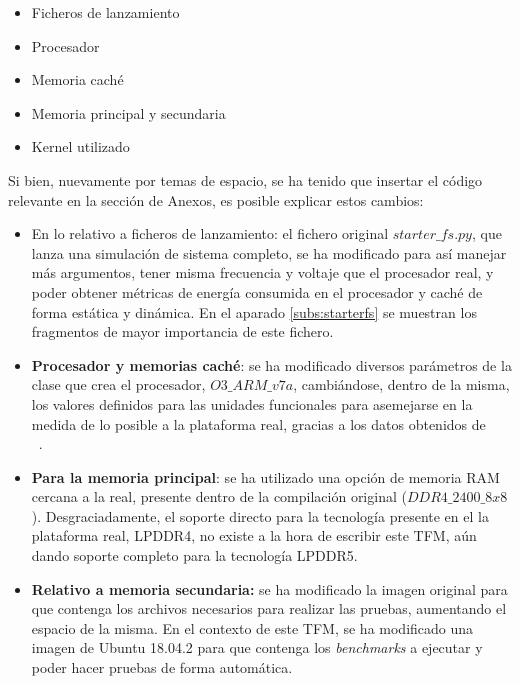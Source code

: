 \begin{itemize}[noitemsep]
\item Ficheros de lanzamiento
\item Procesador
\item Memoria caché
\item Memoria principal y secundaria
\item Kernel utilizado
\end{itemize}

Si bien, nuevamente por temas de espacio, se ha tenido que insertar el código relevante en la sección de Anexos, es posible explicar estos cambios:

\begin{itemize}
    \item En lo relativo a ficheros de lanzamiento: el fichero original $starter\_fs.py$, que lanza una simulación de sistema completo, se ha modificado para así manejar más argumentos, tener misma frecuencia y voltaje que el procesador real, y poder obtener métricas de energía consumida en el procesador y caché de forma estática y dinámica. En el aparado \ref{subs:starterfs} se muestran los fragmentos de mayor importancia de este fichero.
    
    \item \textbf{Procesador y memorias caché}: se ha modificado diversos parámetros de la clase que crea el procesador, $O3\_ARM\_v7a$, cambiándose, dentro de la misma, los valores definidos para las unidades funcionales para asemejarse en la medida de lo posible a la plataforma real, gracias a los datos obtenidos de ~\cite{A72-Gem5-pierre} ~\cite{datasheetA72}.
    
    \item \textbf{Para la memoria principal}: se ha utilizado una opción de memoria RAM cercana a la real, presente dentro de la compilación original ($DDR4\_2400\_8x8$). Desgraciadamente, el soporte directo para la tecnología presente en el la plataforma real, \ac{LPDDR4}, no existe a la hora de escribir este \ac{TFM}, aún dando soporte completo para la tecnología LPDDR5.
    
    \item \textbf{Relativo a memoria secundaria:} se ha modificado la imagen original para que contenga los archivos necesarios para realizar las pruebas, aumentando el espacio de la misma. En el contexto de este \ac{TFM}, se ha modificado una imagen de Ubuntu 18.04.2 para que contenga los \textit{benchmarks} a ejecutar y poder hacer pruebas de forma automática. 
    

\end{itemize}
